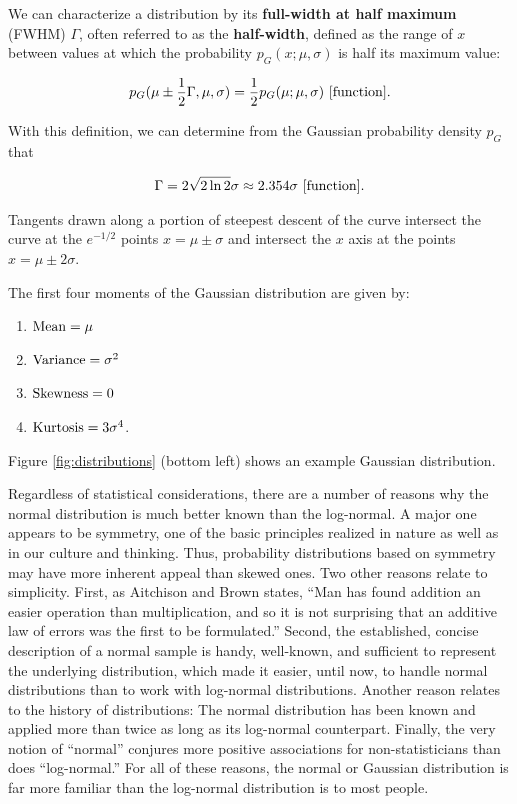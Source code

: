 \documentclass[a4paper,10pt]{article}
\begin{document}
{\noindent}We can characterize a distribution by its \textbf{full-width at half maximum} (FWHM) $\Gamma$, often referred to as the \textbf{half-width}, defined as the range of $x$ between values at which the probability $p_G(x;\mu,\sigma)$ is half its maximum value:

\begin{align*}
    p_G(\mu\pm\frac{1}{2}\Gamma,\mu,\sigma) = \frac{1}{2}p_G(\mu;\mu,\sigma) ~ [{\rm function}].
\end{align*}

{\noindent}With this definition, we can determine from the Gaussian probability density $p_G$ that

\begin{align*}
    \Gamma=2\sqrt{2\ln2}\sigma \approx 2.354\sigma ~ [{\rm function}].
\end{align*}

{\noindent}Tangents drawn along a portion of steepest descent of the curve intersect the curve at the $e^{-1/2}$ points $x=\mu\pm\sigma$ and intersect the $x$ axis at the points $x=\mu\pm2\sigma$.

{\noindent}The first four moments of the Gaussian distribution are given by:

\begin{enumerate}
    \item ${\rm Mean} = \mu$
    \item ${\rm Variance} = \sigma^2$
    \item ${\rm Skewness} = 0$
    \item ${\rm Kurtosis} = 3\sigma^4$.
\end{enumerate}

{\noindent}Figure \ref{fig:distributions} (bottom left) shows an example Gaussian distribution.

{\noindent}Regardless of statistical considerations, there are a number of reasons why the normal distribution is much better known than the log-normal. A major one appears to be symmetry, one of the basic principles realized in nature as well as in our culture and thinking. Thus, probability distributions based on symmetry may have more inherent appeal than skewed ones. Two other reasons relate to simplicity. First, as Aitchison and Brown states, ``Man has found addition an easier operation than multiplication, and so it is not surprising that an additive law of errors was the first to be formulated.'' Second, the established, concise description of a normal sample is handy, well-known, and sufficient to represent the underlying distribution, which made it easier, until now, to handle normal distributions than to work with log-normal distributions. Another reason relates to the history of distributions: The normal distribution has been known and applied more than twice as long as its log-normal counterpart. Finally, the very notion of ``normal'' conjures more positive associations for non-statisticians than does ``log-normal.'' For all of these reasons, the normal or Gaussian distribution is far more familiar than the log-normal distribution is to most people.
\end{document}
